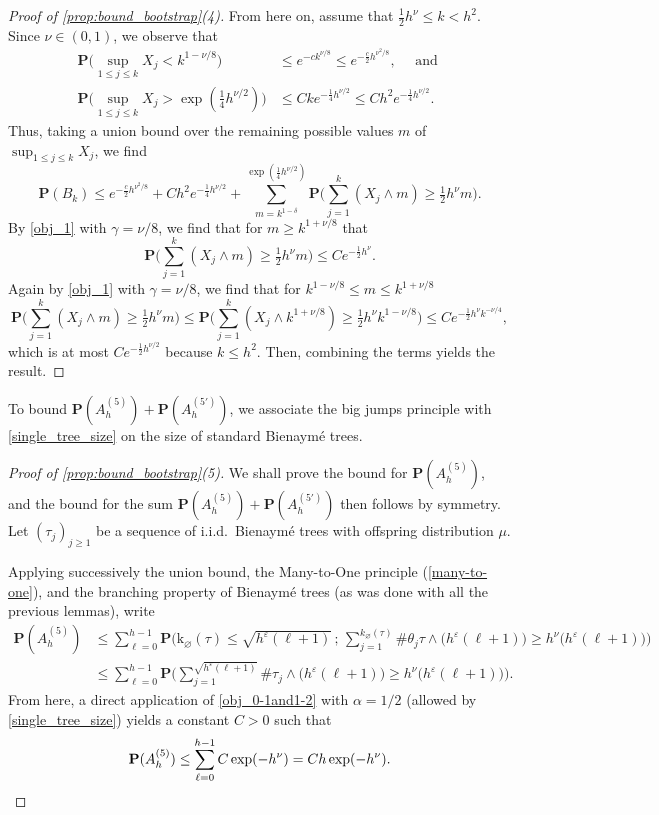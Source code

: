 \documentclass[11pt,reqno]{amsart}
\newcommand{\1}{\mathbf{1}}
\newcommand{\0}{\mathbf{0}}
\newcommand{\prob}{\mathbf{P}}
\newcommand{\rk}{\mathrm{k}}
\renewcommand{\emptyset}{\varnothing}
\begin{document}
\begin{proof}[Proof of \cref{prop:bound_bootstrap}(4)]
    From here on, assume that $\tfrac{1}{2}h^\nu \le k <h^{2}$. Since $\nu\in(0,1)$, we observe that 
    \begin{align*}
    \prob\big(\sup_{1\le j \le k}X_j<k^{1-\nu/8}\big) &\le e^{-ck^{\nu/8}}\le e^{-\frac{c}{2}h^{\nu^2 /8}}, \quad\text{ and }\\
    \prob\big(\sup_{1\le j \le k}X_j>\exp(\tfrac14 h^{\nu/2})\big) &\le C k e^{ - \frac{1}{4}h^{\nu/2}} \le C h^{2} e^{ - \frac{1}{4}h^{\nu/2}}.
    \end{align*}
    Thus, taking a union bound over the remaining possible values $m$ of $\sup_{1\le j \le k}X_j$, we find 
    \[\prob(B_k)\le e^{-\frac{c}{2}h^{\nu^2/8 }}+ C h^{2} e^{ - \frac{1}{4}h^{\nu/2}} + \sum_{m=k^{1-\delta}}^{\exp(\tfrac14 h^{\nu/2})} \prob\Big(\sum_{j=1}^k (X_j \wedge m) \ge \tfrac{1}{2}h^\nu m \Big). \]
    By \cref{obj_1} with $\gamma=\nu/8$, we find that for $m\ge k^{1+\nu/8}$ that 
    \[\prob\Big(\sum_{j=1}^k (X_j \wedge m) \ge \tfrac{1}{2}h^\nu m  \Big)\le Ce^{-\frac{1}{2}h^\nu}.\]
    Again by \cref{obj_1} with $\gamma=\nu/8$, we find that for $k^{1-\nu/8}\le m\le k^{1+\nu/8}$ 
    \[\prob\Big(\sum_{j=1}^k (X_j \wedge m) \ge \tfrac{1}{2} h^\nu m  \Big) \le \prob\Big(\sum_{j=1}^k (X_j \wedge k^{1+\nu/8}) \ge \tfrac{1}{2}h^\nu k^{1-\nu/8}  \Big)\le Ce^{-\frac{1}{2}h^\nu k^{-\nu/4}},\] 
    which is at most $Ce^{-\frac{1}{2}h^{\nu/2}}$ because $k\le h^2$. Then, combining the terms yields the result. 
\end{proof}


To bound $\prob(A_h^{(5)})+\prob(A_{h}^{(5')})$, we associate the big jumps principle with \cref{single_tree_size} on the size of standard Bienaymé trees.

\begin{proof}[Proof of \cref{prop:bound_bootstrap}(5)]
   
    We shall prove the bound for $\prob(A_{h}^{(5)})$, and the bound for the sum $\prob(A_{h}^{(5)})+\prob(A_{h}^{(5')})$ then follows by symmetry. Let $(\tau_j)_{j\geq 1}$ be a sequence of i.i.d.~Bienaym\'{e} trees with offspring distribution $\mu$.
    
    Applying successively the union bound, the Many-to-One principle (\cref{many-to-one}), and the branching property of Bienaymé trees (as was done with all the previous lemmas), write
    \begin{align*}
    \prob(A_{h}^{(5)}) &\leq \sum_{\ell = 0}^{h-1} \prob\Big( \rk_\emptyset(\tau) \leq \sqrt{h^\varepsilon(\ell+1)}\, ;\, \sum_{j=1}^{k_\emptyset(\tau)} \# \theta_j\tau \wedge \big(h^\varepsilon (\ell+1)\big) \geq h^\nu \big(h^\varepsilon (\ell+1)\big)\Big)\\
    &\leq \sum_{\ell = 0}^{h-1} \prob\Big( \sum_{j=1}^{\sqrt{h^\varepsilon(\ell+1)}} \# \tau_j \wedge \big(h^\varepsilon (\ell+1)\big) \geq h^\nu \big(h^\varepsilon (\ell+1)\big)\Big).
    \end{align*}
    From here, a direct application of \cref{obj_0-1and1-2} with $\alpha=1/2$ (allowed by \cref{single_tree_size}) yields a constant $C > 0$ such that
    \[\prob(A_{h}^{(5)}) \leq \sum_{\ell = 0}^{h-1} C\exp(-h^\nu) = Ch\exp(-h^\nu). \qedhere\]
\end{proof}
\end{document}
